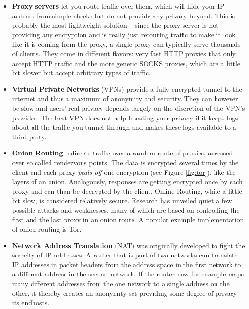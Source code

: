 \documentclass{acm_proc_article-sp}
\begin{document}
\begin{itemize}
\item \textbf{Proxy servers} let you route traffic over them, which will hide your IP address from simple checks but do not provide any privacy beyond. This is probably the most lightweight solution -- since the proxy server is not providing any encryption and is really just rerouting traffic to make it look like it is coming from the proxy, a single proxy can typically serve thousands of clients. They come in different flavors: very fast HTTP proxies that only accept HTTP traffic and the more generic SOCKS proxies, which are a little bit slower but accept arbitrary types of traffic.
\item \textbf{Virtual Private Networks} (VPNs) provide a fully encrypted tunnel to the internet and thus a maximum of anonymity and security. They can however be slow and users' real privacy depends largely on the discretion of the VPN's provider. The best VPN does not help boosting your privacy if it keeps logs about all the traffic you tunnel through and makes these logs available to a third party. 
\item \textbf{Onion Routing} redirects traffic over a random route of proxies, accessed over so called rendezvous points. The data is encrypted several times by the client and each proxy \emph{peals off} one encryption (see Figure \ref{fig:tor}), like the layers of an onion. Analogously, responses are getting encrypted once by each proxy and can than be decrypted by the client. Online Routing, while a little bit slow, is considered relatively secure. Research has unveiled quiet a few possible attacks and weaknesses, many of which are based on controlling the first and the last proxy in an onion route. A popular example implementation of onion routing is Tor.
\item \textbf{Network Address Translation} (NAT) was originally developed to fight the scarcity of IP addresses. A router that is part of two networks can translate IP addresses in packet headers from the address space in the first network to a different address in the second network. If the router now for example maps many different addresses from the one network to a single address on the other, it thereby creates an anonymity set providing some degree of privacy its endhosts.
\end{itemize}
\end{document}
